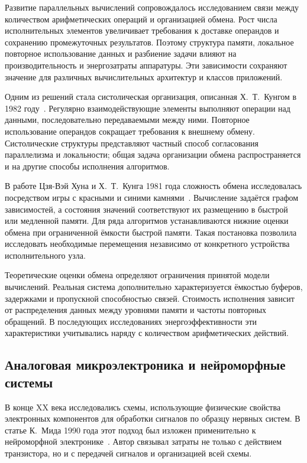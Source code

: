 Развитие параллельных вычислений сопровождалось исследованием связи
между количеством арифметических операций и организацией обмена.
Рост числа исполнительных элементов увеличивает требования
к доставке операндов и сохранению промежуточных результатов.
Поэтому структура памяти, локальное повторное использование данных
и разбиение задачи влияют на производительность и энергозатраты аппаратуры.
Эти зависимости сохраняют значение для различных вычислительных
архитектур и классов приложений.

Одним из решений стала систолическая организация, описанная
Х.~Т.~Кунгом в 1982 году~\cite{kung1982}. Регулярно взаимодействующие
элементы выполняют операции над данными, последовательно
передаваемыми между ними. Повторное использование операндов
сокращает требования к внешнему обмену. Систолические структуры
представляют частный способ согласования параллелизма и локальности;
общая задача организации обмена распространяется и на другие
способы исполнения алгоритмов.

В работе Цзя-Вэй Хуна и Х.~Т.~Кунга 1981 года сложность обмена
исследовалась посредством игры с красными и синими камнями~\cite{hong1981}.
Вычисление задаётся графом зависимостей, а состояния значений
соответствуют их размещению в быстрой или медленной памяти.
Для ряда алгоритмов устанавливаются нижние оценки обмена
при ограниченной ёмкости быстрой памяти. Такая постановка
позволила исследовать необходимые перемещения независимо
от конкретного устройства исполнительного узла.

Теоретические оценки обмена определяют ограничения принятой
модели вычислений. Реальная система дополнительно характеризуется
ёмкостью буферов, задержками и пропускной способностью связей.
Стоимость исполнения зависит от распределения данных между
уровнями памяти и частоты повторных обращений. В последующих
исследованиях энергоэффективности эти характеристики учитывались
наряду с количеством арифметических действий.

\subsection{Аналоговая микроэлектроника и нейроморфные системы}

В конце XX века исследовались схемы, использующие
физические свойства электронных компонентов для обработки
сигналов по образцу нервных систем. В статье К.~Мида
1990 года этот подход был изложен применительно
к нейроморфной электронике~\cite{mead1990}.
Автор связывал затраты не только с действием транзистора,
но и с передачей сигналов и организацией всей схемы.

